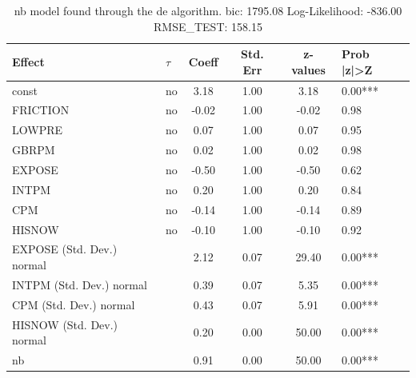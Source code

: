 \begin{table}
	\caption{nb model found through the de algorithm. bic: 1795.08 Log-Likelihood: -836.00 RMSE_TEST: 158.15}
	\begin{center}
		\begin{tabular}{|l|l|c|c|c|l|}
			\hline
			Effect & $\tau$ & Coeff & Std. Err & z-values & Prob |z|>Z \\
			\hline
			const & no & 3.18 & 1.00 & 3.18 & 0.00*** \\
			\hline
			FRICTION & no & -0.02 & 1.00 & -0.02 & 0.98 \\
			\hline
			LOWPRE & no & 0.07 & 1.00 & 0.07 & 0.95 \\
			\hline
			GBRPM & no & 0.02 & 1.00 & 0.02 & 0.98 \\
			\hline
			EXPOSE & no & -0.50 & 1.00 & -0.50 & 0.62 \\
			\hline
			INTPM & no & 0.20 & 1.00 & 0.20 & 0.84 \\
			\hline
			CPM & no & -0.14 & 1.00 & -0.14 & 0.89 \\
			\hline
			HISNOW & no & -0.10 & 1.00 & -0.10 & 0.92 \\
			\hline
			EXPOSE (Std. Dev.) normal &  & 2.12 & 0.07 & 29.40 & 0.00*** \\
			\hline
			INTPM (Std. Dev.) normal &  & 0.39 & 0.07 & 5.35 & 0.00*** \\
			\hline
			CPM (Std. Dev.) normal &  & 0.43 & 0.07 & 5.91 & 0.00*** \\
			\hline
			HISNOW (Std. Dev.) normal &  & 0.20 & 0.00 & 50.00 & 0.00*** \\
			\hline
			nb &  & 0.91 & 0.00 & 50.00 & 0.00*** \\
			\hline
		\end{tabular}
	\end{center}
\end{table}